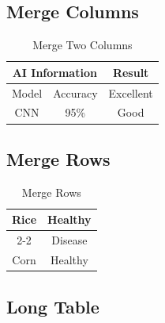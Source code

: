 \documentclass[pdflatex,sn-mathphys-num]{sn-jnl}%
\theoremstyle{thmstyleone}%
\theoremstyle{thmstyletwo}%
\theoremstyle{thmstylethree}%
\begin{document}
\subsection{Merge Columns}

\begin{table}[h]

\centering

\caption{Merge Two Columns}
\label{tab:mergecolumn}

\begin{tabular}{|c|c|c|}

\hline

\multicolumn{2}{|c|}{AI Information}&Result\\

\hline

Model&Accuracy&Excellent\\

\hline

CNN&95\%&Good\\

\hline

\end{tabular}

\end{table}
\subsection{Merge Rows}

\begin{table}[h]

\centering

\caption{Merge Rows}
\label{tab:mergerow}

\begin{tabular}{|c|c|}

\hline

\multirow{2}{*}{Rice}

&Healthy\\

\cline{2-2}

&Disease\\

\hline

Corn&Healthy\\

\hline

\end{tabular}

\end{table}


\subsection{Long Table}
\end{document}
